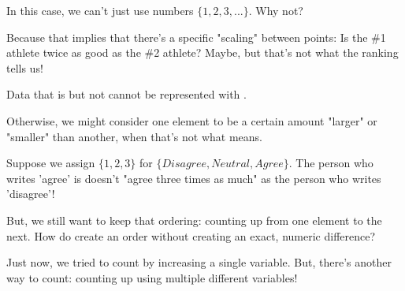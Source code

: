                 In this case, we can't just use numbers $\{1,2,3,...\}$. Why not?

                Because that implies that there's a specific "scaling" between points: Is the \#1 athlete twice as good as the \#2 athlete? Maybe, but that's not what the ranking tells us!\\

                \begin{concept}
                    Data that is  but not  cannot be represented with .

                    Otherwise, we might consider one element to be a certain amount "larger" or "smaller" than another, when that's not what  means.
                \end{concept}

                \miniex Suppose we assign $\{1,2,3\}$ for $\{Disagree, Neutral, Agree\}$. The person who writes 'agree' is doesn't "agree three times as much" as the person who writes 'disagree'!

                But, we still want to keep that ordering: counting up from one element to the next. How do create an order without creating an exact, numeric difference?

                Just now, we tried to count by increasing a single variable. But, there's another way to count: counting up using multiple different variables!


